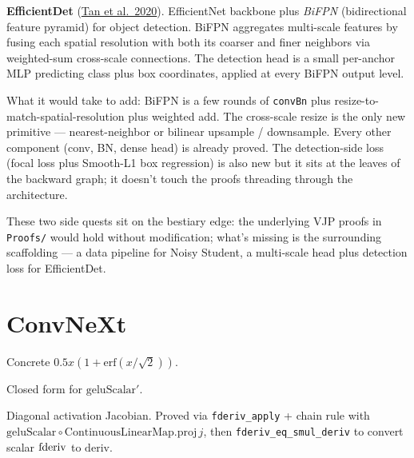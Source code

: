 \textbf{EfficientDet}
(\href{https://arxiv.org/abs/1911.09070}{Tan et al.\ 2020}).
EfficientNet backbone plus \emph{BiFPN} (bidirectional feature
pyramid) for object detection. BiFPN aggregates multi-scale
features by fusing each spatial resolution with both its coarser
and finer neighbors via weighted-sum cross-scale connections. The
detection head is a small per-anchor MLP predicting class plus box
coordinates, applied at every BiFPN output level.

What it would take to add: BiFPN is a few rounds of \texttt{convBn}
plus resize-to-match-spatial-resolution plus weighted add. The
cross-scale resize is the only new primitive ---
nearest-neighbor or bilinear upsample / downsample. Every other
component (conv, BN, dense head) is already proved. The
detection-side loss (focal loss plus Smooth-L1 box regression) is
also new but it sits at the leaves of the backward graph; it
doesn't touch the proofs threading through the architecture.

These two side quests sit on the bestiary edge: the underlying VJP
proofs in \texttt{Proofs/} would hold without modification; what's
missing is the surrounding scaffolding --- a data pipeline for
Noisy Student, a multi-scale head plus detection loss for
EfficientDet.

\chapter{ConvNeXt}
\label{chap:layernorm}

\begin{definition}
  \label{ax:geluScalar}
  \leanok
  Concrete \(0.5x(1 + \mathrm{erf}(x/\sqrt 2))\).
\end{definition}

\begin{definition}
  \label{ax:geluScalarDeriv}
  \leanok
  Closed form for \(\mathrm{geluScalar}'\).
\end{definition}

\begin{theorem}
  \label{ax:pdiv_gelu}
  \leanok
  Diagonal activation Jacobian. Proved via \texttt{fderiv\_apply} +
  chain rule with \(\mathrm{geluScalar} \circ \mathrm{ContinuousLinearMap.proj}\,
  j\), then \texttt{fderiv\_eq\_smul\_deriv} to convert scalar
  \(\operatorname{fderiv}\) to \(\mathrm{deriv}\).
\end{theorem}

